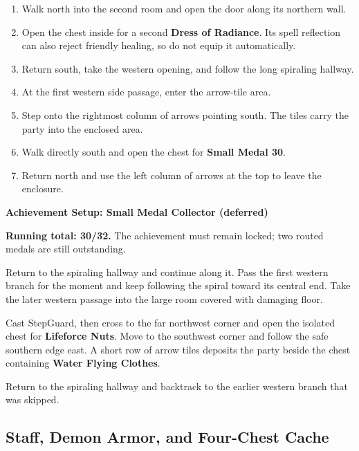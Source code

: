 \documentclass[
  american,
  10pt,
  letterpaper,
  oneside,
  open=any]{scrreprt}
\providecommand{\tightlist}{%
  \setlength{\itemsep}{0pt}\setlength{\parskip}{0pt}}
\begin{document}
\begin{enumerate}
\def\labelenumi{\arabic{enumi}.}
\tightlist
\item
  Walk north into the second room and open the door along its northern
  wall.
\item
  Open the chest inside for a second \textbf{Dress of Radiance}. Its
  spell reflection can also reject friendly healing, so do not equip it
  automatically.
\item
  Return south, take the western opening, and follow the long spiraling
  hallway.
\item
  At the first western side passage, enter the arrow-tile area.
\item
  Step onto the rightmost column of arrows pointing south. The tiles
  carry the party into the enclosed area.
\item
  Walk directly south and open the chest for \textbf{Small Medal 30}.
\item
  Return north and use the left column of arrows at the top to leave the
  enclosure.
\end{enumerate}

\begin{achievementsetup}

\textbf{Achievement Setup: Small Medal Collector (deferred)}

\textbf{Running total: 30/32.} The achievement must remain locked; two
routed medals are still outstanding.

\end{achievementsetup}

Return to the spiraling hallway and continue along it. Pass the first
western branch for the moment and keep following the spiral toward its
central end. Take the later western passage into the large room covered
with damaging floor.

Cast StepGuard, then cross to the far northwest corner and open the
isolated chest for \textbf{Lifeforce Nuts}. Move to the southwest corner
and follow the safe southern edge east. A short row of arrow tiles
deposits the party beside the chest containing \textbf{Water Flying
Clothes}.

Return to the spiraling hallway and backtrack to the earlier western
branch that was skipped.

\subsection{Staff, Demon Armor, and Four-Chest
Cache}\label{staff-demon-armor-and-four-chest-cache}
\end{document}
